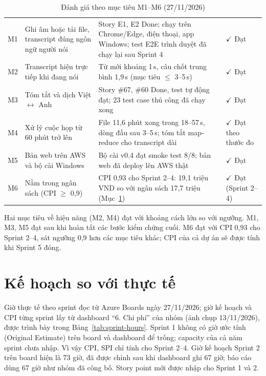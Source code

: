 \documentclass[12pt,a4paper]{report}
\newcommand{\pass}{$\checkmark$}
\begin{document}
\begin{table}[htbp]
  \centering
  \caption{Đánh giá theo mục tiêu M1--M6 (27/11/2026)}
  \label{tab:objectives-check}
  \small
  \setlength{\tabcolsep}{4pt}
  \begin{tabularx}{\linewidth}{@{}Q{0.8cm}P{3.6cm}LP{2.3cm}@{}}
    \toprule
     &  &  &  \\
    \midrule
    M1 & Ghi âm hoặc tải file, transcript đúng ngôn ngữ người nói & Story E1, E2 Done; chạy trên Chrome/Edge, điện
      thoại, app Windows; test E2E trình duyệt đã chạy lại sau Sprint 4 & \pass{} Đạt \\
    M2 & Transcript hiện trực tiếp khi đang nói & Từ mới khoảng 1\,s, câu chốt trung bình 1,9\,s (mục tiêu
      $\leq$ 3--5\,s) & \pass{} Đạt \\
    M3 & Tóm tắt và dịch Việt $\leftrightarrow$ Anh & Story \#67, \#60 Done, test tự động đạt; 23 test case thủ công
      đã chạy xong & \pass{} Đạt \\
    M4 & Xử lý cuộc họp từ 60 phút trở lên & File 11,6 phút xong trong 18--57\,s, dòng đầu sau 3--5\,s; tóm tắt
      map-reduce cho transcript dài & \pass{} Đạt theo thước đo \\
    M5 & Bản web trên AWS và bộ cài Windows & Bộ cài v0.4 đạt smoke test 8/8; bản web đã deploy lên AWS thật
      & \pass{} Đạt \\
    M6 & Nằm trong ngân sách (CPI $\geq$ 0,9) & CPI 0,93 cho Sprint 2--4: 19,1 triệu VND so với ngân sách
      17,7 triệu (Mục~\ref{sec:plan-actual}) & \pass{} Đạt (Sprint 2--4) \\
    \bottomrule
  \end{tabularx}
\end{table}

Hai mục tiêu về hiệu năng (M2, M4) đạt với khoảng cách lớn so với ngưỡng. M1, M3, M5 đạt sau khi hoàn tất các bước
kiểm chứng cuối. M6 đạt với CPI 0,93 cho Sprint 2--4, sát ngưỡng 0,9 hơn các mục tiêu khác; CPI của cả dự án sẽ được tính khi Sprint 5 đóng.

\section{Kế hoạch so với thực tế}
\label{sec:plan-actual}

Giờ thực tế theo sprint đọc từ Azure Boards ngày 27/11/2026; giờ kế hoạch và CPI từng sprint lấy từ dashboard
``6. Chi phí'' của nhóm (ảnh chụp 13/11/2026), được trình bày trong Bảng~\ref{tab:sprint-hours}. Sprint 1 không có giờ
ước tính (Original Estimate) trên board và dashboard để trống; capacity của cả năm sprint chưa nhập. Vì vậy CPI, SPI chỉ
tính cho Sprint 2--4. Giờ kế hoạch Sprint 2 trên board hiện là 73 giờ, đã được chỉnh sau khi dashboard ghi 67 giờ; báo cáo
dùng 67 giờ như nhóm đã công bố. Story point mới được nhập cho Sprint 1 và 2.
\end{document}
